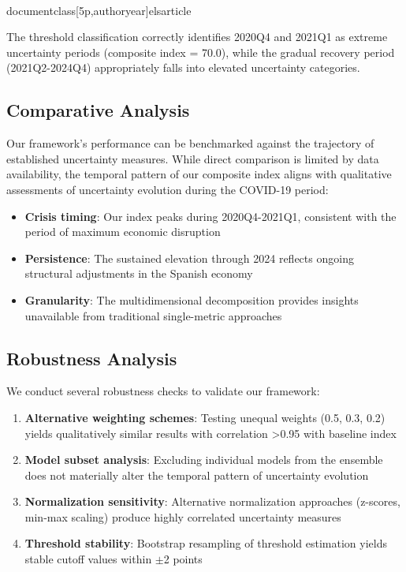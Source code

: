 \\documentclass[5p,authoryear]{elsarticle}
\begin{document}
{The threshold classification correctly identifies 2020Q4 and 2021Q1 as extreme uncertainty periods (composite index = 70.0), while the gradual recovery period (2021Q2-2024Q4) appropriately falls into elevated uncertainty categories.

\subsection{Comparative Analysis}

Our framework's performance can be benchmarked against the trajectory of established uncertainty measures. While direct comparison is limited by data availability, the temporal pattern of our composite index aligns with qualitative assessments of uncertainty evolution during the COVID-19 period:

\begin{itemize}
    \item \textbf{Crisis timing}: Our index peaks during 2020Q4-2021Q1, consistent with the period of maximum economic disruption
    \item \textbf{Persistence}: The sustained elevation through 2024 reflects ongoing structural adjustments in the Spanish economy
    \item \textbf{Granularity}: The multidimensional decomposition provides insights unavailable from traditional single-metric approaches
\end{itemize}

\subsection{Robustness Analysis}

We conduct several robustness checks to validate our framework:

\begin{enumerate}
    \item \textbf{Alternative weighting schemes}: Testing unequal weights (0.5, 0.3, 0.2) yields qualitatively similar results with correlation >0.95 with baseline index
    \item \textbf{Model subset analysis}: Excluding individual models from the ensemble does not materially alter the temporal pattern of uncertainty evolution
    \item \textbf{Normalization sensitivity}: Alternative normalization approaches (z-scores, min-max scaling) produce highly correlated uncertainty measures
    \item \textbf{Threshold stability}: Bootstrap resampling of threshold estimation yields stable cutoff values within $\pm$2 points
\end{enumerate}

}
\end{document}
